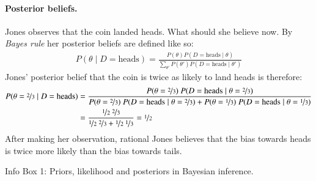 \documentclass[nobib]{tufte-handout}
\begin{document}
\begin{InfoBox}[t]
{\begin{minipage}{1.0\textwidth}
    \paragraph{Posterior beliefs.} Jones observes that the coin landed heads. What should she
    believe now. By \emph{Bayes rule} her posterior beliefs are defined like so:
    \begin{align*}
      P(\theta \mid D = \text{heads}) = \frac{P(\theta) P(D = \text{heads} \mid \theta)}{\sum_{\theta'}P(\theta') P(D = \text{heads} \mid \theta')}
    \end{align*}
    Jones' posterior belief that the coin is twice as likely to land heads is therefore:
    \begin{align*}
      P(\theta = \nicefrac{2}{3} \mid D = \text{heads}) & = \frac{P(\theta = \nicefrac{2}{3}) \ P(D = \text{heads} \mid \theta = \nicefrac{2}{3})}{P(\theta = \nicefrac{2}{3}) \ P(D = \text{heads} \mid \theta = \nicefrac{2}{3}) + P(\theta = \nicefrac{1}{3}) \ P(D = \text{heads} \mid \theta = \nicefrac{1}{3})} \\
            & = \frac{\nicefrac{1}{2} \ \nicefrac{2}{3}}{\nicefrac{1}{2} \ \nicefrac{2}{3} + \nicefrac{1}{2} \ \nicefrac{1}{3}} = \nicefrac{1}{2}
    \end{align*}
    After making her observation, rational Jones believes that the bias towards heads is twice
    more likely than the bias towards tails.

  \end{minipage} \par
  } \par
  \begin{center}
    Info Box 1: Priors, likelihood and posteriors in Bayesian inference.
  \end{center}
\end{InfoBox}






\printbibliography[heading=bibintoc]
\end{document}
